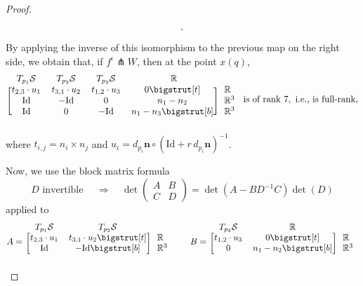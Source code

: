 \documentclass[11pt]{article}
\newcommand{\R}{\mathbb{R}}
\newcommand{\io}{\iota}
\newcommand{\nbf}{\mathbf{n}}
\newcommand{\Surf}{\mathcal{S}}
\newcommand{\Id}{\mathrm{Id}}
\newcommand\topstrut[1][1.2ex]{\setlength\bigstrutjot{#1}{\bigstrut[t]}}
\newcommand\botstrut[1][1.2ex]{\setlength\bigstrutjot{#1}{\bigstrut[b]}}
\theoremstyle{plain}
\theoremstyle{definition}
\theoremstyle{remark}
\begin{document}
\begin{proof}
\begin{equation*}
\begin{blockarray}{ccccl}
\end{blockarray}.
\end{equation*}
By applying the inverse of this isomorphism to the previous map on the right side, we obtain that, if $f^\io \pitchfork W$, then at the point $x(q)$,
\begin{equation*}
	\begin{blockarray}{ccccl}
		\begin{block}{ccccl}
			T_{p_1} \Surf & T_{p_2} \Surf & T_{p_3} \Surf & ~~\R~~ & \\
		\end{block}
		\begin{block}{[cccc] l}
			 t_{2,3} \cdot u_1 & t_{3,1} \cdot u_2 & t_{1,2} \cdot u_3 & 0 \topstrut & \R \\
			\Id & - \Id & 0 & n_1 - n_2 & \R^3 \\
			\Id & 0 & - \Id & n_1 - n_3 \botstrut & \R^3 \\
		\end{block}
	\end{blockarray}
	\text{ is of rank } 7, \text{ i.e., is full-rank},
\end{equation*}
where $t_{i,j} = n_i \times n_j$ and $u_i =  d_{p_i} \nbf \circ (\Id + r \, d_{p_i} \nbf)^{-1}$.

Now, we use the block matrix formula
\[D \text{ invertible } \quad \Rightarrow \quad \det 
\begin{pmatrix}
	A & B \\
	C & D
\end{pmatrix} = \det(A - B D^{-1} C) \det(D)\]
applied to 
\[A = 
	\begin{blockarray}{ccl}
	\begin{block}{ccl}
		T_{p_1} \Surf & T_{p_2} \Surf & \\
	\end{block}
	\begin{block}{[cc] l}
		t_{2,3} \cdot u_1 & t_{3,1} \cdot u_2 \topstrut & \R \\
		\Id & - \Id \botstrut & \R^3 \\
	\end{block}
\end{blockarray}
\qquad
B = 
 \begin{blockarray}{ccl}
 	\begin{block}{ccl}
 		T_{p_3} \Surf & \R & \\
 	\end{block}
 	\begin{block}{[cc] l}
 		t_{1,2} \cdot u_3 & 0 \topstrut & \R \\
 		0 & n_1 - n_2 \botstrut & \R^3 \\
 	\end{block}
 \end{blockarray}
 \]
 

\end{proof}
\end{document}
